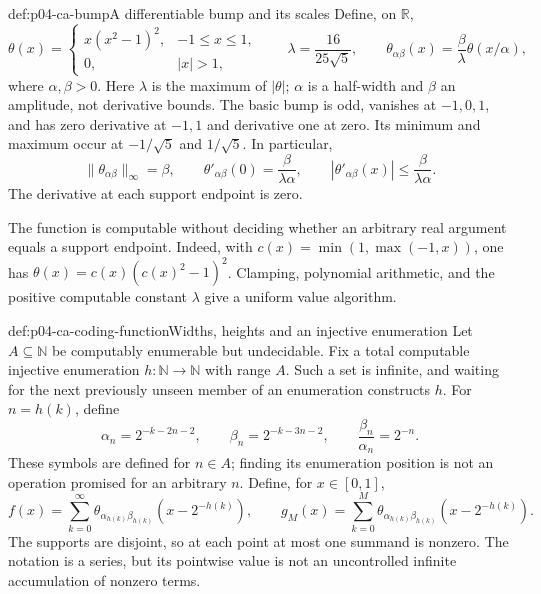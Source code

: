 \begin{hbdefinition}{def:p04-ca-bump}{A differentiable bump and its scales}
Define, on \(\mathbb R\),
\[
 \theta(x)=
 \begin{cases}x(x^2-1)^2,&-1\leq x\leq1,\\
 0,&|x|>1,\end{cases}
 \qquad \lambda=\frac{16}{25\sqrt5},\qquad
 \theta_{\alpha\beta}(x)=\frac{\beta}{\lambda}
                         \theta(x/\alpha),
\]
where \(\alpha,\beta>0\). Here \(\lambda\) is the maximum
of \(|\theta|\); \(\alpha\) is a half-width and \(\beta\)
an amplitude, not derivative bounds. The basic bump is odd,
vanishes at \(-1,0,1\), and has zero derivative at \(-1,1\)
and derivative one at zero. Its minimum and maximum occur at
\(-1/\sqrt5\) and \(1/\sqrt5\). In particular,
\[
 \lVert\theta_{\alpha\beta}\rVert_\infty=\beta,
 \qquad \theta'_{\alpha\beta}(0)=\frac{\beta}{\lambda\alpha},
 \qquad |\theta'_{\alpha\beta}(x)|\leq
                         \frac{\beta}{\lambda\alpha}.
\]
The derivative at each support endpoint is zero.
\end{hbdefinition}

The function is computable without deciding whether an arbitrary real
argument equals a support endpoint. Indeed, with
\(c(x)=\min(1,\max(-1,x))\), one has
\(\theta(x)=c(x)(c(x)^2-1)^2\). Clamping, polynomial arithmetic,
and the positive computable constant \(\lambda\) give a uniform
value algorithm.

\begin{hbdefinition}{def:p04-ca-coding-function}{Widths, heights and an injective enumeration}
Let \(A\subseteq\mathbb N\) be computably enumerable but undecidable.
Fix a total computable injective enumeration
\(h:\mathbb N\to\mathbb N\) with range \(A\).
Such a set is infinite, and waiting for the next previously unseen member
of an enumeration constructs \(h\).
For \(n=h(k)\), define
\[
 \alpha_n=2^{-k-2n-2},\qquad
 \beta_n=2^{-k-3n-2},\qquad
 \frac{\beta_n}{\alpha_n}=2^{-n}.
\]
These symbols are defined for \(n\in A\); finding its enumeration
position is not an operation promised for an arbitrary \(n\).
Define, for \(x\in[0,1]\),
\[
 f(x)=\sum_{k=0}^{\infty}
   \theta_{\alpha_{h(k)}\beta_{h(k)}}(x-2^{-h(k)}),
 \qquad
 g_M(x)=\sum_{k=0}^{M}
   \theta_{\alpha_{h(k)}\beta_{h(k)}}(x-2^{-h(k)}).
\]
The supports are disjoint, so at each point at most one summand is
nonzero. The notation is a series, but its pointwise value is not an
uncontrolled infinite accumulation of nonzero terms.
\end{hbdefinition}

